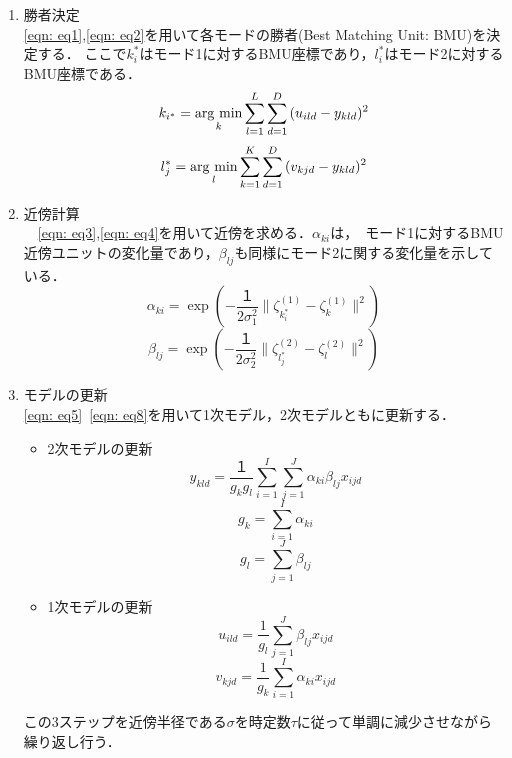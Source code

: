 \begin{enumerate}
	\item 勝者決定\\
	\ref{eqn: eq1},\ref{eqn: eq2}を用いて各モードの勝者(Best Matching Unit: BMU)を決定する． ここで$k_i^*$はモード1に対するBMU座標であり，$l_i^*$はモード2に対するBMU座標である．
	\begin{equation}
		k_{i^*} = \mathop{\rm arg~min}\limits_{k}\sum_{l=1}^L\sum_{d=1}^D{(u_{ild}-y_{kld})^2}
		\label{eqn: eq1}
	\end{equation}
	\begin{equation}
		l_j^* = \mathop{\rm arg~min}\limits_{l}\sum_{k=1}^K\sum_{d=1}^D{( v_{kjd}-y_{kld})^2}
		\label{eqn: eq2}
	\end{equation}
	
	\item 近傍計算\\
	　\ref{eqn: eq3},\ref{eqn: eq4}を用いて近傍を求める．$\alpha_{ki}$は，　モード1に対するBMU近傍ユニットの変化量であり，$\beta_{lj}$も同様にモード2に関する変化量を示している．
	\begin{equation}
		\alpha_{ki}=\exp(-\frac{１}{2\sigma_{1}^2}\|\zeta_{k_i^*}^{(1)}-\zeta_k^{(1)}\|^2)
		\label{eqn: eq3}
	\end{equation}
	\begin{equation}
		\beta_{lj}=\exp(-\frac{１}{2\sigma_{2}^2}\|\zeta_{l_j^*}^{(2)}-\zeta_l^{(2)}\|^2)
		\label{eqn: eq4}
	\end{equation}
	
	\item モデルの更新\\
	\ref{eqn: eq5}~\ref{eqn: eq8}を用いて1次モデル，2次モデルともに更新する．
	\begin{itemize}
	\item 2次モデルの更新\\
	\begin{equation}
		y_{kld} = \frac{１}{g_kg_l}\sum_{i=1}^I\sum_{j=1}^J{\alpha_{ki}\beta_{lj}x_{ijd}}
		\label{eqn: eq5}
	\end{equation}
	\begin{equation}
	g_k = \sum_{i=1}^I{\alpha_{ki}}
		\label{eqn: eq6}
	\end{equation}
	\begin{equation}
	g_l = \sum_{j=1}^J{\beta_{lj}}
		\label{eqn: eq7}
	\end{equation}
	\item 1次モデルの更新\\
	\begin{equation}
	u_{ild} = \frac{1}{g_l}\sum_{j=1}^J{\beta_{lj}x_{ijd}}
		\label{eqn: eq8}
	\end{equation}
	\begin{equation}
	v_{kjd} = \frac{1}{g_k}\sum_{i=1}^I{\alpha_{ki}x_{ijd}}
		\label{eqn: eq9}
	\end{equation}
	\end{itemize}
	この3ステップを近傍半径である$\sigma$を時定数$\tau$に従って単調に減少させながら繰り返し行う．
\end{enumerate}

